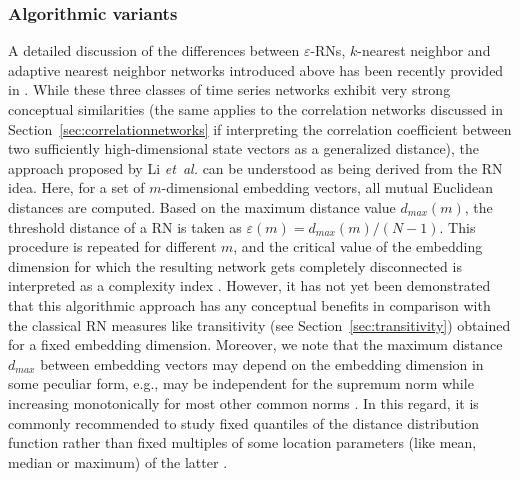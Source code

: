 		\subsubsection{Algorithmic variants}
		A detailed discussion of the differences between $\varepsilon$-RNs, $k$-nearest neighbor and adaptive nearest neighbor networks introduced above has been recently provided in \cite{Donner2011}. While these three classes of time series networks exhibit very strong conceptual similarities (the same applies to the correlation networks \cite{Yang2008} discussed in Section~\ref{sec:correlationnetworks} if interpreting the correlation coefficient between two sufficiently high-dimensional state vectors as a generalized distance), the approach proposed by Li \textit{et~al.} \cite{Li2011a,Li2011b,Cao2014,Fan2015} can be understood as being derived from the RN idea. Here, for a set of $m$-dimensional embedding vectors, all mutual Euclidean distances are computed. Based on the maximum distance value $d_{max}(m)$, the threshold distance of a RN is taken as $\varepsilon(m)=d_{max}(m)/(N-1)$. This procedure is repeated for different $m$, and the critical value of the embedding dimension for which the resulting network gets completely disconnected is interpreted as a complexity index \cite{Cao2014}. However, it has not yet been demonstrated that this algorithmic approach has any conceptual benefits in comparison with the classical RN measures like transitivity (see Section~\ref{sec:transitivity}) obtained for a fixed embedding dimension. Moreover, we note that the maximum distance $d_{max}$ between embedding vectors may depend on the embedding dimension in some peculiar form, e.g., may be independent for the supremum norm while increasing monotonically for most other common norms \cite{Kraemer2018}. In this regard, it is commonly recommended to study fixed quantiles of the distance distribution function rather than fixed multiples of some location parameters (like mean, median or maximum) of the latter \cite{Kraemer2018}.


